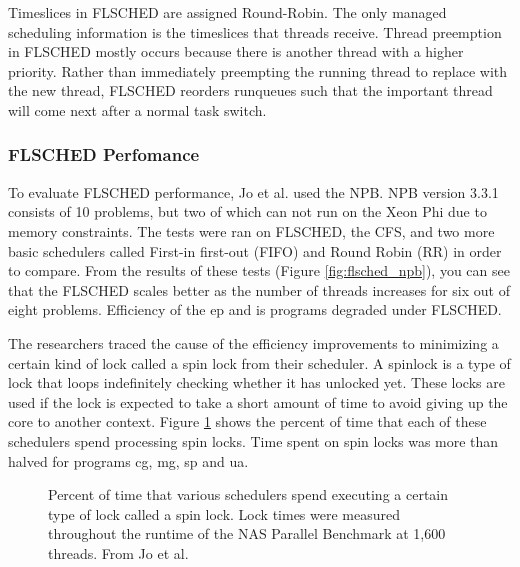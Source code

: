 \documentclass{sig-alternate}
\begin{document}
Timeslices in FLSCHED are assigned Round-Robin. The only managed scheduling information is the timeslices that threads receive. Thread preemption in FLSCHED mostly occurs because there is another thread with a higher priority. Rather than immediately preempting the running thread to replace with the new thread, FLSCHED reorders runqueues such that the important thread will come next after a normal task switch.~\cite{Jo:2017}


\subsubsection{FLSCHED Perfomance}
\label{sec:flsched_performance}

 To evaluate FLSCHED performance, Jo et al. used the NPB. NPB version 3.3.1 consists of 10 problems, but two of which can not run on the Xeon Phi due to memory constraints. The tests were ran on FLSCHED, the CFS, and two more basic schedulers called First-in first-out (FIFO) and Round Robin (RR) in order to compare. From the results of these tests (Figure \ref{fig:flsched_npb}), you can see that the FLSCHED scales better as the number of threads increases for six out of eight problems. Efficiency of the ep and is programs degraded under FLSCHED.~\cite{Jo:2017}

\begin{figure*}
\centering
{}
\caption{FLSCHED performance comparison of various schedulers on programs in the NAS Parallel Benchmark. From Jo et al.~\cite{Jo:2017}}
\label{fig:flsched_npb}
\end{figure*}

The researchers traced the cause of the efficiency improvements to minimizing a certain kind of lock called a spin lock from their scheduler. A spinlock is a type of lock that loops indefinitely checking whether it has unlocked yet. These locks are used if the lock is expected to take a short amount of time to avoid giving up the core to another context. Figure \ref{fig:flsched_spinlock} shows the percent of time that each of these schedulers spend processing spin locks. Time spent on spin locks was more than halved for programs cg, mg, sp and ua.~\cite{Jo:2017}

\begin{figure}
\centering
{}
\caption{ Percent of time that various schedulers spend executing a certain type of lock called a spin lock. Lock times were measured throughout the runtime of the NAS Parallel Benchmark at 1,600 threads. From Jo et al.~\cite{Jo:2017}}
\label{fig:flsched_spinlock}
\end{figure}
\end{document}
